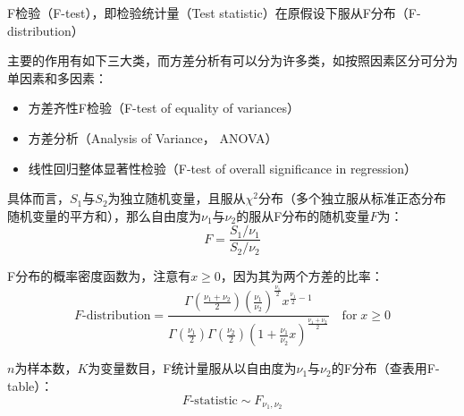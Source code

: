 \documentclass[11pt]{article}
\begin{document}
F检验（F-test），即检验统计量（Test statistic）在原假设下服从F分布（F-distribution）

主要的作用有如下三大类，而方差分析有可以分为许多类，如按照因素区分可分为单因素和多因素：
\begin{itemize}
    \item 方差齐性F检验（F-test of equality of variances）
    \item 方差分析（Analysis of Variance， ANOVA）
    \item 线性回归整体显著性检验（F-test of overall significance in regression）
\end{itemize}

具体而言，$S_1$与$S_2$为独立随机变量，且服从$\chi^2$分布（多个独立服从标准正态分布随机变量的平方和），那么自由度为$\nu_1$与$\nu_2$的服从F分布的随机变量$F$为：
\begin{equation*}
    F = \frac{S_1/\nu_1}{S_2/\nu_2}
\end{equation*}

F分布的概率密度函数为，注意有$x\geq 0$，因为其为两个方差的比率：
\begin{equation*}
    F\text{-distribution} = \frac{\Gamma\left(\frac{\nu_1+\nu_2}{2}\right)\left(\frac{\nu_1}{\nu_2}\right)^{\frac{\nu_1}{2}} x^{\frac{\nu_1}{2}-1}}{\Gamma\left(\frac{\nu_1}{2}\right)\Gamma\left(\frac{\nu_2}{2}\right)\left(1+\frac{\nu_1}{\nu_2}x\right)^{\frac{\nu_1+\nu_2}{2}}} \quad \text{for}\; x\geq 0
\end{equation*}

$n$为样本数，$K$为变量数目，F统计量服从以自由度为$\nu_1$与$\nu_2$的F分布（查表用F-table）：
\begin{equation*}
    F\text{-statistic} \sim F_{\nu_1,\nu_2}
\end{equation*}
\end{document}
